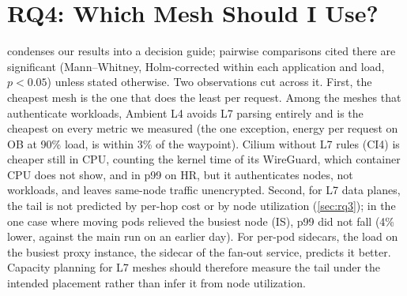 \section{RQ4: Which Mesh Should I Use?}
\label{sec:rq4}

 condenses our results into a decision guide; pairwise
comparisons cited there are significant (Mann--Whitney, Holm-corrected within
each application and load, $p<0.05$) unless stated otherwise. Two observations
cut across it. First, the cheapest mesh is the one that does the least per
request. Among the meshes that authenticate workloads, Ambient L4 avoids L7
parsing entirely and is the cheapest on every metric we measured (the one
exception, energy per request on OB at 90\% load, is within 3\% of the
waypoint). Cilium without L7 rules (CI4) is cheaper still in CPU, counting the
kernel time of its WireGuard, which container CPU does not show, and in p99 on
HR, but it authenticates nodes, not workloads, and leaves same-node traffic
unencrypted.
Second, for L7 data planes, the tail is not predicted by per-hop cost or by
node utilization (\cref{sec:rq3}); in the one case where moving pods
relieved the busiest node (IS), p99 did not fall (4\% lower, against the main
run on an earlier day). For per-pod sidecars, the load on the busiest proxy
instance, the sidecar of the fan-out service, predicts it better. Capacity
planning for L7 meshes should therefore measure the tail under the intended
placement rather than infer it from node utilization.

